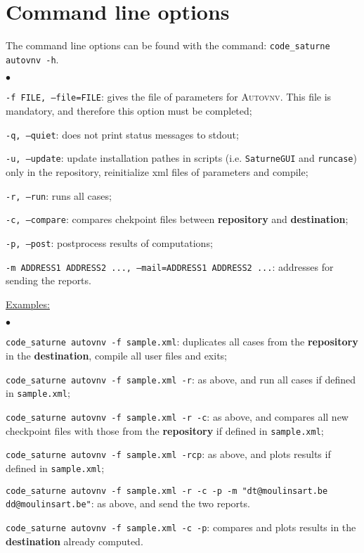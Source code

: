 \documentclass[a4paper,10pt,twoside]{csshortdoc}
\begin{document}
\section{Command line options}

The command line options can be found with the command: \texttt{code\_saturne
autovnv -h}.

\begin{list}{$\bullet$}{}
\item \texttt{-f FILE, --file=FILE}: gives the file of parameters for
\textsc{Autovnv}. This file is mandatory, and therefore this option must be
completed;
\item \texttt{-q, --quiet}: does not print status messages to stdout;
\item \texttt{-u, --update}: update installation pathes in scripts (i.e. \texttt{SaturneGUI} and
\texttt{runcase}) only in the repository, reinitialize xml files of parameters and compile;
\item \texttt{-r, --run}: runs all cases;
\item \texttt{-c, --compare}: compares chekpoint files between
\textbf{repository} and \textbf{destination};
\item \texttt{-p, --post}: postprocess results of computations;
\item \texttt{-m ADDRESS1 ADDRESS2 ..., --mail=ADDRESS1 ADDRESS2 ...}: addresses
for sending the reports.
\end{list}

\underline{Examples:}

\begin{list}{$\bullet$}{}
\item \texttt{code\_saturne autovnv -f sample.xml}: duplicates all cases from
the \textbf{repository} in the \textbf{destination}, compile all user files
and exits;
\item \texttt{code\_saturne autovnv -f sample.xml -r}: as above, and run all
cases if defined in \texttt{sample.xml};
\item \texttt{code\_saturne autovnv -f sample.xml -r -c}: as above, and compares
all new checkpoint files with those from the \textbf{repository} if defined
in \texttt{sample.xml};
\item \texttt{code\_saturne autovnv -f sample.xml -rcp}: as above, and plots
results if defined in \texttt{sample.xml};
\item \texttt{code\_saturne autovnv -f sample.xml -r -c -p -m
"dt@moulinsart.be dd@moulinsart.be"}: as above, and send the two
reports.
\item \texttt{code\_saturne autovnv -f sample.xml -c -p}: compares and plots
results in the \textbf{destination} already computed.
\end{list}
\end{document}
